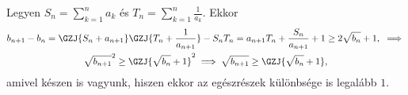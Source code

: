 Legyen $S_{n}=\sum_{k=1}^{n} a_k$ és $T_{n}=\sum_{k=1}^{n} \frac{1}{a_k}$. Ekkor 
\begin{gather*}
b_{n+1}-b_{n}=\GZJ{S_{n}+a_{n+1}}\GZJ{T_{n}+\frac{1}{a_{n+1}}}-S_{n}T_{n}=
a_{n+1}T_{n}+\frac{S_{n}}{a_{n+1}}+1 \ge 2\sqrt{b_{n}}+1, \ \implies \\
\sqrt{b_{n+1}}^{2} \ge \GZJ{\sqrt{b_{n}}+1}^{2} \implies \sqrt{b_{n+1}} \ge \GZJ{\sqrt{b_{n}}+1}, 
\end{gather*}
amivel készen is vagyunk, hiszen ekkor az egészrészek különbsége is legalább $1$.
